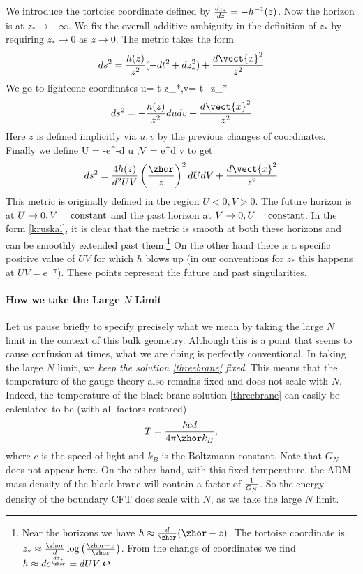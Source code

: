 We introduce the tortoise coordinate defined by
$
{dz_* \over dz} =- h^{-1}(z)
$. Now the horizon is at $z_*\rightarrow-\infty$. We fix the overall additive ambiguity in the definition of $z_*$ by requiring $z_*\rightarrow 0$ as $z\rightarrow 0$. The metric takes the form
\[
ds^2 = {h(z) \over z^2}(-dt^2 +dz_*^2) +{d\vect{x}^2 \over z^2}
\]
We go to lightcone coordinates
\be
\label{lightconec}
u= t-z_*\qquad,\quad v= t+z_*
\ee
\[
ds^2 = -{h(z)\over z^2} du dv + {d\vect{x}^2 \over z^2}
\]
Here $z$ is defined implicitly via $u,v$ by the previous changes of coordinates. Finally we define
\be
\label{kruskalc}
U = -e^{-{d u  \zhor}}\qquad,\qquad V = e^{{d v  \zhor}}
\ee
to get
\begin{equation}
\label{kruskal}
ds^2 = {4 h(z)\over d^2 U V} \left({\zhor \over z}\right)^2
 dU dV +{d\vect{x}^2 \over z^2}
\end{equation}
This metric is originally defined in the region $U<0,V>0$. The future horizon is at $U\rightarrow 0, V={\rm constant}$ and the past horizon at $V\rightarrow 0, U={\rm constant}$. In the form \eqref{kruskal}, it is clear that the metric is smooth at both these horizons and can be smoothly extended past them.\footnote{Near the horizons we have $h \approx {d\over \zhor}(\zhor-z)$. The tortoise coordinate is $z_* \approx {\zhor \over d}\log\left({\zhor-z \over \zhor}\right)$. From the change of coordinates we find $h \approx d e^{d z_* \over \zhor} = d U V.$}
On the other hand there is a specific positive value of $UV$ for which $h$ blows up (in our conventions for $z_*$ this happens at $UV = e^{-\pi}$). These points represent the future and past singularities.


\paragraph{How we take the Large $N$ Limit \\}
Let us pause briefly to specify precisely what we mean by taking the large $N$ limit in the context of this bulk geometry. Although this is a point that seems to cause confusion at times, what we are doing is perfectly conventional. In taking the large $N$ limit, we {\em keep the solution \eqref{threebrane} fixed}. This means that the temperature of the gauge theory also remains fixed and does not scale with $N$. Indeed, the temperature of the black-brane solution \eqref{threebrane} can easily be calculated to be (with all factors restored) 
\[
T = {\hbar c d \over 4 \pi \zhor k_B},
\]
where $c$ is the speed of light and $k_B$ is the Boltzmann constant. Note that $G_N$ does not appear here.  On the other hand, with this fixed temperature, the  ADM mass-density of the black-brane will contain a factor of ${1 \over G_N}$. So the energy density of the boundary CFT does scale with $N$, as we take the large $N$ limit. 

